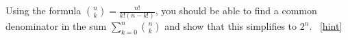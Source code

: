 \documentclass{book}
\begin{document}
\setcounter{project}{76}
\addtocounter{project}{-1}
\begin{activity}[]\label{act-pascalrowsum-alg}
\hypertarget{p-608}{}%
Using the formula \(\binom{n}{k} = \frac{n!}{k!(n-k!)}\), you should be able to find a common denominator in the sum \(\sum_{k=0}^n \binom{n}{k}\) and show that this simplifies to \(2^n\).%
~\hfill{\tiny\hyperlink{a-76}{[hint]}\hypertarget{q-76}{}}\end{activity}
\end{document}
